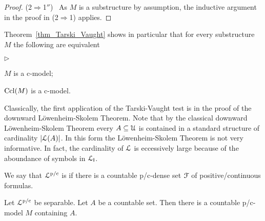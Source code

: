 \documentclass{amsproc}
\newcommand{\mylabel}[1]{{#1}\hfill}
\renewenvironment{itemize}
  {\begin{list}{$\triangleright$}{%
  \setlength{\parskip}{0mm}
  \setlength{\topsep}{.4\baselineskip}
  \setlength{\rightmargin}{0mm}
  \setlength{\listparindent}{0mm}
  \setlength{\itemindent}{0mm}
  \setlength{\labelwidth}{3ex}
  \setlength{\itemsep}{.2\baselineskip}
  \setlength{\parsep}{.2\baselineskip}
  \setlength{\partopsep}{0mm}
  \setlength{\labelsep}{1ex}
  \setlength{\leftmargin}{\labelwidth+\labelsep}
  \let\makelabel\mylabel}}{%
\end{list}}
\renewcommand*{\emph}[1]{%
   \smash{\tikz[baseline]\node[rectangle, fill=teal!25, rounded corners, inner xsep=0.5ex, inner ysep=0.2ex, anchor=base, minimum height = 2.7ex]{\strut #1};}}
\begin{document}
{\begin{proof}
  (2$\Rightarrow$1$''$) \ 
  As $M$ is a substructure by assumption, the inductive argument in the proof in (2$\Rightarrow$1) applies.
\end{proof}


    
   


\begin{remark}\label{rem_Tarski_Vaught}
  Theorem~\ref{thm_Tarski_Vaught} shows in particular that for every substructure $M$ the following are equivalent
  \begin{itemize}
    \item[1.] $M$ is a c-model;
    \item[2.] ${\rm Ccl}(M)$ is a c-model.
  \end{itemize}
\end{remark}

Classically, the first application of the Tarski-Vaught test is in the proof of the downward L\"owen\-heim-Skolem Theorem.
Note that by the classical downward L\"owenheim-Skolem Theorem every $A\subseteq{\EuScript U}$ is contained in a standard structure of cardinality $|{\EuScript L}(A)|$.
In this form the L\"owenheim-Skolem Theorem is not very informative.
In fact, the cardinality of ${\EuScript L}$ is eccessively large because of the aboundance of symbols in ${\EuScript L}_{\sf I}$.

We say that ${\EuScript L}^{\rm p/c}$ is \emph{separable\/} if there is a countable p/c-dense set ${\EuScript F}$ of positive/continuous formulas.

\begin{proposition}
  Let ${\EuScript L}^{\rm p/c}$ be separable.
  Let $A$ be a countable set.
  Then there is a countable p/c-model $M$ containing $A$.
\end{proposition}

}
\end{document}
